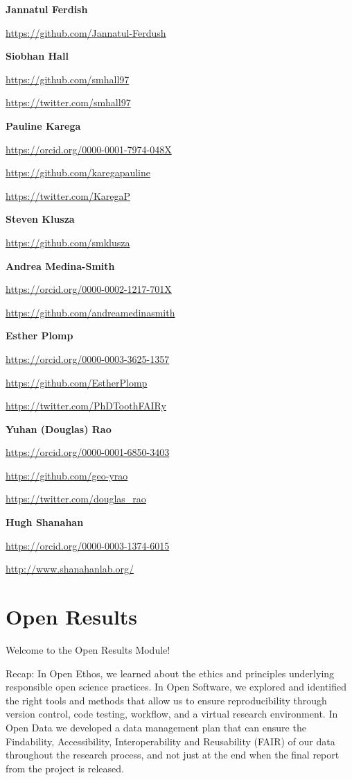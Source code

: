 \documentclass[
  letterpaper,
  DIV=11,
  numbers=noendperiod]{scrreport}
\begin{document}
\textbf{Jannatul Ferdish}

\url{https://github.com/Jannatul-Ferdush}

\textbf{Siobhan Hall}

\url{https://github.com/smhall97}

\url{https://twitter.com/smhall97}

\textbf{Pauline Karega}

\url{https://orcid.org/0000-0001-7974-048X}

\url{https://github.com/karegapauline}

\url{https://twitter.com/KaregaP}

\textbf{Steven Klusza}

\url{https://github.com/smklusza}

\textbf{Andrea Medina-Smith}

\url{https://orcid.org/0000-0002-1217-701X}

\url{https://github.com/andreamedinasmith}

\textbf{Esther Plomp}

\url{https://orcid.org/0000-0003-3625-1357}

\url{https://github.com/EstherPlomp}

\url{https://twitter.com/PhDToothFAIRy}

\textbf{Yuhan (Douglas) Rao}

\url{https://orcid.org/0000-0001-6850-3403}

\url{https://github.com/geo-yrao}

\url{https://twitter.com/douglas_rao}

\textbf{Hugh Shanahan}

\url{https://orcid.org/0000-0003-1374-6015}

\url{http://www.shanahanlab.org/}

\part{Open Results}

Welcome to the Open Results Module!

Recap: In Open Ethos, we learned about the ethics and principles
underlying responsible open science practices. In Open Software, we
explored and identified the right tools and methods that allow us to
ensure reproducibility through version control, code testing, workflow,
and a virtual research environment. In Open Data we developed a data
management plan that can ensure the Findability, Accessibility,
Interoperability and Reusability (FAIR) of our data throughout the
research process, and not just at the end when the final report from the
project is released.
\end{document}
